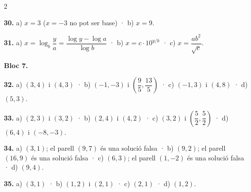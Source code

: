\documentclass[13pt,a4paper]{extarticle}
\begin{document}
\begin{multicols}{2}
\par\noindent\begin{minipage}{\linewidth}
\textbf{30.} a) $x=3$ ($x=-3$ no pot ser base) · b) $x=9$.\par
\end{minipage}\par\vspace{1.6mm}
\par\noindent\begin{minipage}{\linewidth}
\textbf{31.} a) $x=\log_b\dfrac{y}{a}=\dfrac{\log y-\log a}{\log b}$ · b) $x=c\cdot 10^{y/k}$ · c) $x=\dfrac{ab^2}{\sqrt{c}}$.\par
\end{minipage}\par\vspace{1.6mm}
\textbf{Bloc 7.}\par
\par\noindent\begin{minipage}{\linewidth}
\textbf{32.} a) $(3,4)$ i $(4,3)$ · b) $(-1,-3)$ i $\left(\dfrac95,\dfrac{13}{5}\right)$ · c) $(-1,3)$ i $(4,8)$ · d) $(5,3)$.\par
\end{minipage}\par\vspace{1.6mm}
\par\noindent\begin{minipage}{\linewidth}
\textbf{33.} a) $(2,3)$ i $(3,2)$ · b) $(2,4)$ i $(4,2)$ · c) $(3,2)$ i $\left(\dfrac52,\dfrac52\right)$ · d) $(6,4)$ i $(-8,-3)$.\par
\end{minipage}\par\vspace{1.6mm}
\par\noindent\begin{minipage}{\linewidth}
\textbf{34.} a) $(3,1)$; el parell $(9,7)$ és una solució falsa · b) $(9,2)$; el parell $(16,9)$ és una solució falsa · c) $(6,3)$; el parell $(1,-2)$ és una solució falsa · d) $(9,4)$.\par
\end{minipage}\par\vspace{1.6mm}
\par\noindent\begin{minipage}{\linewidth}
\textbf{35.} a) $(3,1)$ · b) $(1,2)$ i $(2,1)$ · c) $(2,1)$ · d) $(1,2)$.\par
\end{minipage}\par\vspace{1.6mm}

\end{multicols}
\end{document}
